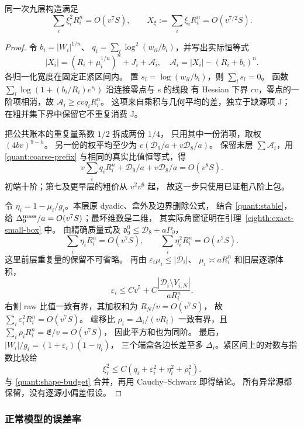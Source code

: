 \begin{lemma}[本族的完整宽度控制]\label{quant:width}
同一次九层构造满足
\[
 \sum_i\xi_i^2R_i^n=O(v^7S),\qquad
 X_\xi:=\sum_i\xi_iR_i^n=O(v^{7/2}S).
\]
\end{lemma}
\begin{proof}
令 \(b_i=|W_i|^{1/n}\)、
\(q_i=\sum_l\log^2(w_{il}/b_i)\)，并写出实际恒等式
\[
 |X_i|=(R_i+\mu_i^{1/n})^n+J_i+\mathcal A_i,
 \quad \mathcal A_i=|X_i|-(R_i+b_i)^n.
\]
各归一化宽度在固定正紧区间内。
置 \(s_l=\log(w_{il}/b_i)\)，则 \(\sum_ls_l=0\)。
函数 \(\sum_l\log(1+(b_i/R_i)e^{s_l})\) 沿连接零点与 s 的线段
有 Hessian 下界 \(cv\)，零点的一阶项相消，故
\(\mathcal A_i\ge cvq_iR_i^n\)。
这项来自乘积与几何平均的差，独立于缺源项 J；
在粗并集下界中保留它不重复消费 J。

把公共账本的重复量系数 \(1/2\) 拆成两份 \(1/4\)，
只用其中一份消项，取权 \((4bv)^{9-h}\)。
另一份的权平均至少为
\(c(\mathcal D_9/a+v\mathcal D_8/a)\)。
保留末层 \(\sum\mathcal A_i\)，用
\eqref{quant:coarse-prefix} 与相同的真实比值恒等式，得
\begin{equation}\label{quant:shape-budget}
 v\sum_iq_iR_i^n+\mathcal D_9/a+v\mathcal D_8/a=O(v^8S).
\end{equation}
初端十阶；第七及更早层的粗价从 \(v^2v^6\) 起，
故这一步只使用已证粗八阶上包。

令 \(\eta_i=1-\mu_i/g_i\)。本层原 dyadic、盒外及边界删除公式，
结合 \eqref{quant:stable}，给
\(\Delta_9^{\rm mass}/a=O(v^7S)\)；最坏维数是二维，
其实际角窗证明在引理~\ref{eighth:exact-small-box} 中。
由精确质量式及
\(\mathfrak d_9^0\le\mathcal D_8+aP_\partial\)，
\[
 \sum_i\eta_iR_i^n=O(v^7S),\qquad
 \sum_i\eta_i^2R_i^n=O(v^7S).
\]
这里前层重复量的保留不可省略。
再由 \(\varepsilon_i\mu_i\le|\mathscr D_i|\)、
\(\mu_i\asymp aR_i^n\) 和旧层逐源体积，
\[
 \varepsilon_i\le Cv^5+C\frac{|\mathscr D_i\setminus Y_{i,N}|}{aR_i^n}.
\]
右侧 raw 比值一致有界，其加权和为 \(R_N/v=O(v^7S)\)，
故 \(\sum_i\varepsilon_i^2R_i^n=O(v^7S)\)。
端移比 \(\rho_i=\Delta_i/(vR_i)\) 一致有界，且
\(\sum_i\rho_iR_i^n=\mathfrak E/v=O(v^7S)\)，
因此平方和也为同阶。
最后，\(|W_i|/g_i=(1+\varepsilon_i)(1-\eta_i)\)，
三个端盒各边长差至多 \(\Delta_i\)。紧区间上的对数与指数比较给
\[
 \xi_i^2\le C(q_i+\varepsilon_i^2+\eta_i^2+\rho_i^2).
\]
与 \eqref{quant:shape-budget} 合并，再用 Cauchy--Schwarz 即得结论。
所有异常源都保留，没有逐源小偏差假设。
\end{proof}

\subsubsection{正常模型的误差率}

